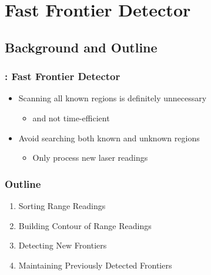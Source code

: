 \section{Fast Frontier Detector}
\subsection*{Background and Outline}

\begin{frame}
\frametitle{\FFD: Fast Frontier Detector}
\begin{itemize}
   \item  Scanning all known regions is definitely unnecessary
 	\begin{itemize} 
 	  \item and not time-efficient
     \end{itemize} \pause
  \item Avoid searching both known and unknown regions
  	\begin{itemize}
  		\item Only process new laser readings
    \end{itemize}
  
\end{itemize}
\end{frame}

\begin{frame}
\frametitle{\FFD Outline}
\begin{enumerate}
  \item Sorting Range Readings
  \item Building Contour of Range Readings  
  \item Detecting New Frontiers
  \item Maintaining Previously Detected Frontiers
   
\end{enumerate}
\end{frame}

